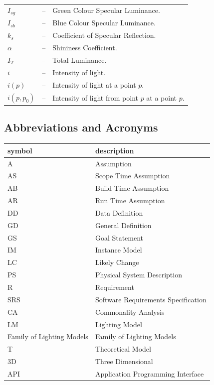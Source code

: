 \documentclass[12pt]{article}
\newcommand{\famname}{Family of Lighting Models} %
\begin{document}
\begin{longtable*}{l l p{12cm}}
  \\
  $I_{sg}$ & -- & Green Colour Specular Luminance.
  \\
  $I_{sb}$ & -- & Blue Colour Specular Luminance.
  \\
  $k_{s}$ & -- & Coefficient of Specular Reflection.
  \\
  $\alpha$ & -- & Shininess Coefficient.
  \\
  $I_{T}$ & -- & Total Luminance.
  \\
  $i$ & -- & Intensity of light. 
  \\
  $i(p)$ & -- & Intensity of light at a point $p$.
  \\
  $i(p, p_{0})$ & -- & Intensity of light from point $p$ at a point $p$.
  \\
  \bottomrule
\end{longtable*}

\subsection{Abbreviations and Acronyms}

\renewcommand{\arraystretch}{1.2}
\begin{tabular}{l l} 
  \toprule		
  \textbf{symbol} & \textbf{description}\\
  \midrule 
  A & Assumption\\
  AS & Scope Time Assumption \\
  AB & Build Time Assumption \\
  AR & Run Time Assumption \\
  DD & Data Definition\\
  GD & General Definition\\
  GS & Goal Statement\\
  IM & Instance Model\\
  LC & Likely Change\\
  PS & Physical System Description\\
  R & Requirement\\
  SRS & Software Requirements Specification\\
  CA & Commonality Analysis \\
  LM & Lighting Model\\
  \famname{} & \famname{}\\
  T & Theoretical Model\\
  3D & Three Dimensional \\
  API & Application Programming Interface \\
  \bottomrule
\end{tabular}\\
\end{document}
